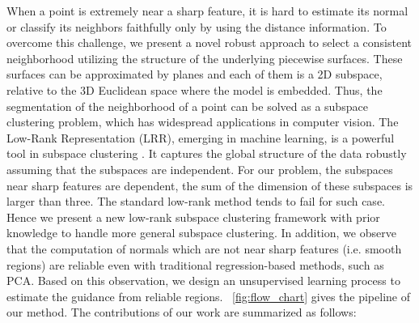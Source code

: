 When a point is extremely near a sharp feature, it is hard to estimate its normal or classify its neighbors faithfully only by using the distance information.
%
To overcome this challenge, we present a novel robust approach to select a consistent neighborhood utilizing the structure of the underlying piecewise surfaces.
%
These surfaces can be approximated by planes and each of them is a 2D subspace, relative to the 3D Euclidean space where the model is embedded.
Thus, the segmentation of the neighborhood of a point can be solved as a subspace clustering problem, which has widespread applications in computer vision.
%
The Low-Rank Representation (LRR), emerging in machine learning, is a powerful tool in subspace clustering \cite{DBLP:journals/corr/abs-1010-2955,LiuLY10}.
It captures the global structure of the data robustly assuming that the subspaces are independent.
%
For our problem, the subspaces near sharp features are dependent, \ie the sum of the dimension of these subspaces is larger than three.
The standard low-rank method tends to fail for such case.
%
Hence we present a new low-rank subspace clustering framework with prior knowledge to handle more general subspace clustering.
In addition, we observe that the computation of normals which are not near sharp features (i.e. smooth regions) are reliable even with traditional regression-based methods, such as PCA.
%
Based on this observation, we design an unsupervised learning process to estimate the guidance from reliable regions.  \fig~\ref{fig:flow_chart} gives the pipeline of our method.
The contributions of our work are summarized as follows:
